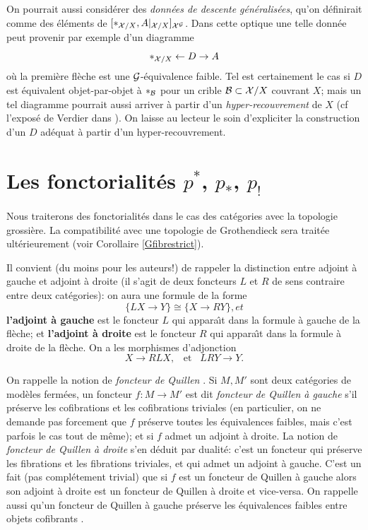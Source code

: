 \documentclass[12pt]{article}
\newcommand{\numero}[1]{\newpage\section{#1}}
\newcommand{\Gg}{{\cal G}}
\newcommand{\Bb}{{\cal B}}
\newcommand{\Xx}{{\cal X}}
\begin{document}
On pourrait aussi consid\'erer des {\em donn\'ees de descente
g\'en\'eralis\'ees}, qu'on d\'efinirait comme des \'el\'ements de
$[\ast _{\Xx
/X}, A|_{\Xx /X}]_{\Xx ^{\Gg}}$.
Dans cette optique une telle donn\'ee peut provenir par exemple d'un diagramme
$$
\ast _{\Xx /X} \leftarrow D \rightarrow A
$$
o\`u la premi\`ere fl\`eche est une $\Gg$-\'equivalence faible. Tel est
certainement le cas si $D$ est \'equivalent objet-par-objet \`a $\ast_{\Bb}$
pour un crible $\Bb \subset \Xx /X$ couvrant $X$; mais un tel diagramme
pourrait aussi arriver \`a partir d'un {\em hyper-recouvrement} de $X$
(cf l'expos\'e de Verdier dans \cite{SGA4b}).
On laisse au lecteur le soin d'expliciter la construction d'un $D$
ad\'equat \`a partir
d'un hyper-recouvrement.





\numero{Les fonctorialit\'es \texorpdfstring{$p^{\ast}$, $p_{\ast}$, $p_!$}{p*, p*, p!}}

\label{fonctorialitepage}

Nous traiterons des fonctorialit\'es dans le cas des cat\'egories avec la
topologie grossi\`ere. La compatibilit\'e avec une topologie de Grothendieck
sera trait\'ee ult\'erieurement (voir Corollaire \ref{Gfibrestrict}).

Il convient (du moins pour les auteurs!) de rappeler la distinction
entre adjoint \`a gauche et adjoint \`a droite (il s'agit de deux
foncteurs $L$ et $R$
de sens contraire
entre deux cat\'egories): on aura une formule de la forme
$$
\{ LX \rightarrow Y \} \cong \{ X \rightarrow RY\}, et
$$
{\bf l'adjoint \`a gauche} est le foncteur $L$ qui appara\^{\i}t dans la
formule \`a
gauche de la fl\`eche; et
\newline
{\bf l'adjoint \`a droite} est le foncteur $R$ qui appara\^{\i}t dans la
formule \`a
droite de la fl\`eche.
\newline
On a les morphismes d'adjonction
$$
X \rightarrow RL X, \;\;\; \mbox{et} \;\;\; LRY \rightarrow Y.
$$

On rappelle la notion de {\em foncteur de Quillen} \cite{Quillen}
\cite{DHK} \cite{HoveyBook} \cite{JardineGoerssBook}. Si $M,M'$ sont deux
cat\'egories de mod\`eles
ferm\'ees, un foncteur $f: M\rightarrow M'$ est dit {\em foncteur de Quillen
\`a gauche} s'il pr\'eserve les cofibrations et les cofibrations triviales (en
particulier, on ne demande pas forcement que $f$ pr\'eserve toutes les
\'equivalences faibles, mais c'est parfois le cas tout de m\^eme); et si $f$
admet un adjoint \`a droite. La notion de {\em
foncteur de Quillen \`a droite} s'en d\'eduit par dualit\'e: c'est un
foncteur qui
pr\'eserve les fibrations et les fibrations triviales, et qui admet un
adjoint \`a gauche.
C'est un fait (pas compl\'etement trivial)
\cite{Quillen} que si $f$ est un foncteur de Quillen \`a gauche alors son
adjoint \`a droite est un foncteur de Quillen \`a droite et vice-versa.
On rappelle aussi qu'un foncteur de Quillen \`a gauche  pr\'eserve les
\'equivalences faibles
entre objets cofibrants \cite{JardineGoerssBook} \cite{DHK} \cite{HoveyBook}.
\end{document}
